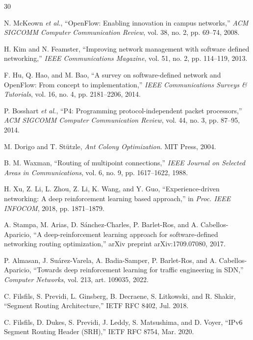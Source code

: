 \documentclass[journal]{IEEEtran}
\begin{document}
\begin{thebibliography}{30}

 N. McKeown \emph{et al.}, ``OpenFlow: Enabling
innovation in campus networks,'' \emph{ACM SIGCOMM Computer Communication
Review}, vol. 38, no. 2, pp. 69--74, 2008.

 H. Kim and N. Feamster, ``Improving network management with
software defined networking,'' \emph{IEEE Communications Magazine}, vol. 51,
no. 2, pp. 114--119, 2013.

 F. Hu, Q. Hao, and M. Bao, ``A survey on software-defined
network and OpenFlow: From concept to implementation,'' \emph{IEEE
Communications Surveys \& Tutorials}, vol. 16, no. 4, pp. 2181--2206, 2014.

 P. Bosshart \emph{et al.}, ``P4: Programming
protocol-independent packet processors,'' \emph{ACM SIGCOMM Computer
Communication Review}, vol. 44, no. 3, pp. 87--95, 2014.

 M. Dorigo and T. St\"utzle, \emph{Ant Colony
Optimization}. MIT Press, 2004.

 B. M. Waxman, ``Routing of multipoint connections,''
\emph{IEEE Journal on Selected Areas in Communications}, vol. 6, no. 9,
pp. 1617--1622, 1988.

 H. Xu, Z. Li, L. Zhou, Z. Li, K. Wang, and Y.
Guo, ``Experience-driven networking: A deep reinforcement learning based
approach,'' in \emph{Proc. IEEE INFOCOM}, 2018, pp. 1871--1879.

 A. Stampa, M. Arias, D. S\'anchez-Charles, P.
Barlet-Ros, and A. Cabellos-Aparicio, ``A deep-reinforcement learning
approach for software-defined networking routing optimization,'' arXiv
preprint arXiv:1709.07080, 2017.

 P. Almasan, J. Su\'arez-Varela, A. Badia-Samper, P.
Barlet-Ros, and A. Cabellos-Aparicio, ``Towards deep reinforcement learning
for traffic engineering in SDN,'' \emph{Computer Networks}, vol. 213, art.
109035, 2022.

 C. Filsfils, S. Previdi, L. Ginsberg, B. Decraene, S.
Litkowski, and R. Shakir, ``Segment Routing Architecture,'' IETF RFC 8402,
Jul. 2018.

 C. Filsfils, D. Dukes, S. Previdi, J. Leddy, S.
Matsushima, and D. Voyer, ``IPv6 Segment Routing Header (SRH),'' IETF RFC
8754, Mar. 2020.


\end{thebibliography}
\end{document}
